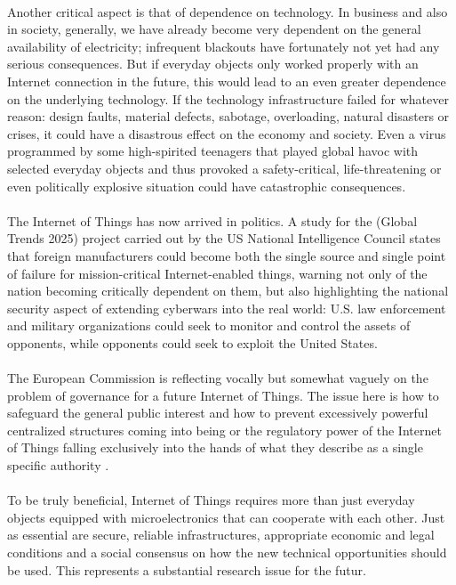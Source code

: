 \documentclass[10pt, twocolumn]{article}
\begin{document}
\paragraph{}
Another critical aspect is that of dependence on technology. In business and also in society, generally, we have already become very dependent on the general availability of electricity; infrequent blackouts have fortunately not yet had any serious consequences. But if everyday objects only worked properly with an Internet connection in the future, this would lead to an even greater dependence on the underlying technology.
If the technology infrastructure failed for whatever reason: design faults, material defects, sabotage, overloading, natural disasters or crises, it could have a disastrous effect on the economy and society. Even a virus programmed by some high-spirited
teenagers that played global havoc with selected everyday objects and thus provoked a safety-critical, life-threatening or even politically explosive situation could have catastrophic consequences.
\paragraph{}
The Internet of Things has now arrived in politics. A study for the (Global Trends 2025) project carried out by the US National Intelligence Council states that foreign manufacturers could become both the single source and single point of failure for mission-critical Internet-enabled things, warning not only of the nation becoming critically dependent on them, but also highlighting the national security aspect of extending cyberwars into the real world: U.S. law enforcement and military
organizations could seek to monitor and control the assets of opponents, while opponents could seek to exploit the United States.
\paragraph{}
The European Commission is reflecting vocally but somewhat vaguely on the problem of governance for a future Internet of Things. The issue here is how to safeguard the general public interest and how to prevent excessively powerful centralized structures coming into being or the regulatory power of the Internet of Things falling exclusively into the hands of what they describe as a single specific authority \cite{ref14}.
\paragraph{}
To be truly beneficial, Internet of Things requires more than just everyday objects equipped with microelectronics that can cooperate with each other. Just as essential are secure, reliable infrastructures, appropriate economic and legal conditions and a social consensus on how the new technical opportunities should be used. This represents a substantial research issue for the futur.
\end{document}
